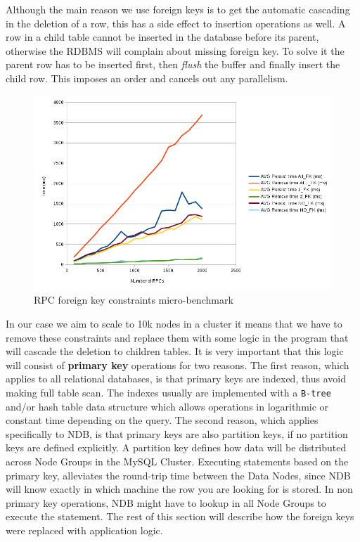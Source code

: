 Although the main reason we use foreign keys is to get the
automatic cascading in the deletion of a row, this has a side effect to
insertion operations as well. A row in a child table cannot be inserted
in the database before its parent, otherwise the RDBMS will complain
about missing foreign key. To solve it the parent row has to be
inserted first, then \emph{flush} the buffer and finally insert the child row. This
imposes an order and cancels out any parallelism.

\begin{figure}
\centering
\includegraphics[scale=0.7]{resources/images/Implementation/rpc_fk_overhead.png}
\caption{RPC foreign key constraints micro-benchmark}
\label{fig:impl_fk_overhead}
\end{figure}

In our case we aim to scale to 10k nodes in a
cluster it means that we have to remove these constraints and replace
them with some logic in the program that will cascade the deletion to
children tables. It is very important that this logic will consist of
\textbf{primary key} operations for two reasons. The first reason, which
applies to all relational databases, is that primary keys are indexed,
thus avoid making full table scan. The indexes usually are
implemented with a \texttt{B-tree} and/or hash table data structure which allows
operations in logarithmic or constant time depending on the query. The second reason, which applies
specifically to NDB, is that primary keys are also partition keys, if
no partition keys are defined explicitly. A
partition key defines how data will be distributed across Node Groups
in the MySQL Cluster. Executing statements based on the primary key,
alleviates the round-trip time between the Data Nodes, since NDB will
know exactly in which machine the row you are looking for is
stored. In non primary key operations, NDB might have to lookup in all
Node Groups to execute the statement. The rest of this
section will describe how the foreign keys were replaced with
application logic.


